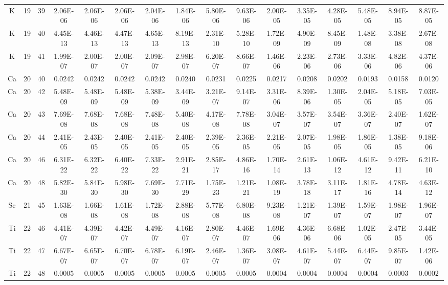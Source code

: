 {\begin{tabular}{|c|c|c|c|c|c|c|c|c|c|c|c|c|c|c|c|}
K  & 19 & 39  & 2.06E-06 & 2.06E-06 & 2.06E-06 & 2.04E-06 & 1.84E-06 & 5.80E-06 & 9.63E-06 & 2.00E-05 & 3.35E-05 & 4.28E-05 & 5.48E-05 & 8.94E-05 & 8.87E-05 \\
K  & 19 & 40  & 4.45E-13 & 4.46E-13 & 4.47E-13 & 4.65E-13 & 8.19E-13 & 2.31E-10 & 5.28E-10 & 1.72E-09 & 4.90E-09 & 8.45E-09 & 1.48E-08 & 3.38E-08 & 2.67E-08 \\
K  & 19 & 41  & 1.99E-07 & 2.00E-07 & 2.00E-07 & 2.09E-07 & 2.98E-07 & 6.20E-07 & 8.66E-07 & 1.46E-06 & 2.23E-06 & 2.73E-06 & 3.33E-06 & 4.82E-06 & 4.37E-06 \\
Ca & 20 & 40  & 0.0242   & 0.0242   & 0.0242   & 0.0242   & 0.0240   & 0.0231   & 0.0225   & 0.0217   & 0.0208   & 0.0202   & 0.0193   & 0.0158   & 0.0120   \\
Ca & 20 & 42  & 5.48E-09 & 5.48E-09 & 5.48E-09 & 5.38E-09 & 3.44E-09 & 3.21E-07 & 9.14E-07 & 3.31E-06 & 8.39E-06 & 1.30E-05 & 2.04E-05 & 5.18E-05 & 7.03E-05 \\
Ca & 20 & 43  & 7.69E-08 & 7.68E-08 & 7.68E-08 & 7.48E-08 & 5.40E-08 & 4.17E-08 & 7.78E-08 & 3.04E-07 & 3.57E-07 & 3.54E-07 & 3.36E-07 & 2.40E-07 & 1.62E-07 \\
Ca & 20 & 44  & 2.41E-05 & 2.43E-05 & 2.40E-05 & 2.41E-05 & 2.40E-05 & 2.39E-05 & 2.36E-05 & 2.21E-05 & 2.07E-05 & 1.98E-05 & 1.86E-05 & 1.38E-05 & 9.18E-06 \\
Ca & 20 & 46  & 6.31E-22 & 6.32E-22 & 6.40E-22 & 7.33E-22 & 2.91E-21 & 2.85E-17 & 4.86E-16 & 1.70E-14 & 2.61E-13 & 1.06E-12 & 4.61E-12 & 9.42E-11 & 6.21E-10 \\
Ca & 20 & 48  & 5.82E-30 & 5.84E-30 & 5.98E-30 & 7.69E-30 & 7.71E-29 & 1.75E-23 & 1.21E-21 & 1.08E-19 & 3.78E-18 & 3.11E-17 & 1.81E-16 & 4.78E-14 & 4.63E-12 \\
Sc & 21 & 45  & 1.63E-08 & 1.66E-08 & 1.61E-08 & 1.72E-08 & 2.88E-08 & 5.77E-08 & 6.80E-08 & 9.23E-08 & 1.21E-07 & 1.39E-07 & 1.59E-07 & 1.98E-07 & 1.96E-07 \\
Ti & 22 & 46  & 4.41E-07 & 4.39E-07 & 4.42E-07 & 4.49E-07 & 4.16E-07 & 2.80E-07 & 4.46E-07 & 1.69E-06 & 4.36E-06 & 6.68E-06 & 1.02E-05 & 2.47E-05 & 3.44E-05 \\
Ti & 22 & 47  & 6.67E-07 & 6.65E-07 & 6.70E-07 & 6.78E-07 & 6.19E-07 & 2.46E-07 & 1.36E-07 & 3.08E-07 & 4.61E-07 & 5.44E-07 & 6.44E-07 & 9.85E-07 & 1.42E-06 \\
Ti & 22 & 48  & 0.0005   & 0.0005   & 0.0005   & 0.0005   & 0.0005   & 0.0005   & 0.0005   & 0.0004   & 0.0004   & 0.0004   & 0.0004   & 0.0003   & 0.0002   \\

\end{tabular}}
